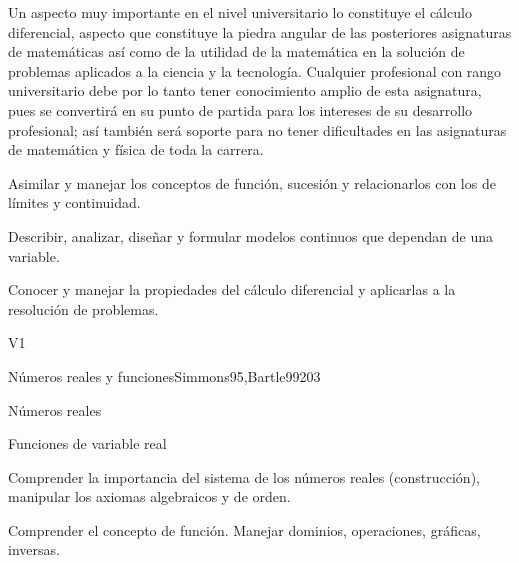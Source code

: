 \begin{syllabus}


\begin{justification}
Un aspecto muy importante en el nivel universitario lo constituye el cálculo diferencial,  aspecto que constituye la piedra angular de las posteriores asignaturas de matemáticas así como de la utilidad de la matemática en la solución de problemas aplicados a la ciencia y la tecnología. Cualquier profesional con rango universitario debe por lo tanto tener conocimiento amplio de esta asignatura, pues se convertirá en su punto de partida para los intereses de su desarrollo profesional; así también será soporte para no tener dificultades en las asignaturas de matemática y física de toda la carrera.
\end{justification}

\begin{goals}
\item Asimilar y manejar los conceptos de función, sucesión y relacionarlos con los de límites y continuidad.
\item Describir, analizar, diseñar y formular modelos continuos que dependan de una variable.
\item Conocer y manejar la propiedades del cálculo diferencial y aplicarlas a la resolución de problemas.
\end{goals}

\begin{outcomes}{V1}
   \item {}
   \item {}
   \item {}
\end{outcomes}

\begin{unit}{Números reales y funciones}{}{Simmons95,Bartle99}{20}{3}
   \begin{topics}
      \item Números reales
      \item Funciones de variable real
   \end{topics}

   \begin{learningoutcomes}
      \item Comprender la importancia del sistema de los números reales (construcción), manipular los axiomas algebraicos y de orden.
      \item Comprender el concepto de función. Manejar dominios, operaciones, gráficas, inversas.
      \end{learningoutcomes}
\end{unit}


\end{syllabus}
